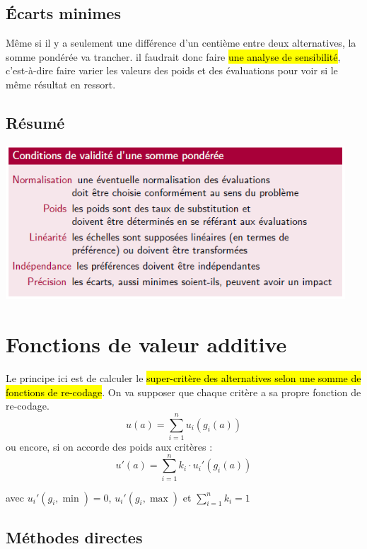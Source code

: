 \documentclass[a4paper, 12pt]{article}
\newcommand{\alinea}{
\hspace*{0.5cm}}
\begin{document}
	\subsection{\'Ecarts minimes}
		\alinea Même si il y a seulement une différence d'un centième entre deux alternatives, la somme pondérée va trancher.
			il faudrait donc faire \hl{une analyse de sensibilité}, c'est-à-dire faire varier les valeurs des poids et des évaluations
			pour voir si le même résultat en ressort.
	\subsection{Résumé}
		\begin{center}
			\includegraphics[width=5in]{Images/somme}
		\end{center}
%
\section{Fonctions de valeur additive}
	\alinea Le principe ici est de calculer le \hl{super-critère des alternatives selon une somme de fonctions de re-codage}.
		On va supposer que chaque critère a sa propre fonction de re-codage.
		$$ u(a) = \sum\limits^{n}_{i=1} u_i(g_i(a)) $$
		ou encore, si on accorde des poids aux critères : 
		$$ u'(a) = \sum\limits^{n}_{i=1} k_i \cdot u_i'(g_i(a)) $$
		\begin{center}
		avec $u_i'(g_i, \min) = 0$, $u_i'(g_i, \max)$ et $\sum\limits^{n}_{i=1} k_i = 1$
		\end{center}
	\subsection{Méthodes directes}
\end{document}
